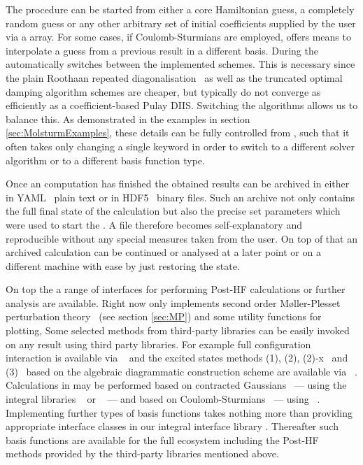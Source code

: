 The \SCF procedure can be started from either a core Hamiltonian guess,
a completely random guess or any other arbitrary set of initial
coefficients supplied by the user via a \numpy array.
For some cases, \eg if Coulomb-Sturmians are employed,
\molsturm offers means to interpolate a guess from a previous result
in a different basis.
During the \SCF \molsturm automatically switches between
the implemented \SCF schemes.
This is necessary since the plain Roothaan
repeated diagonalisation~\cite{Roothaan1951}
as well as the truncated optimal damping algorithm schemes
are cheaper, but typically do not converge as efficiently
as a coefficient-based Pulay DIIS.
Switching the algorithms allows us to balance this.
As demonstrated in the examples in section \ref{sec:MolsturmExamples},
these details can be fully controlled from \python,
such that it often takes only changing a single keyword
in order to switch to a different solver algorithm or to a different
basis function type.

Once an \SCF computation has finished the obtained results can be archived
in either in YAML~\cite{Ben-Kiki2009} plain text or in HDF5~\cite{HDF5Manual}
binary files.
Such an archive not only contains the full final state of the calculation
but also the precise set parameters which were used to start the \SCF.
A file therefore becomes self-explanatory and reproducible
without any special measures taken from the user.
On top of that an archived calculation can be continued
or analysed at a later point or on a different machine with ease
by just restoring the state.

On top the \SCF a range of interfaces for
performing Post-HF calculations or further analysis are available.
Right now \molsturm only implements second order Møller-Plesset perturbation theory%
~(see section \ref{sec:MP})
and some utility functions for plotting,
Some selected methods from third-party libraries can be easily
invoked on any \SCF result using third party libraries.
For example full configuration interaction is available via \pyscf~\cite{Sun2017}
and the excited states methods
\ADC(1), \ADC(2), \ADC(2)-x~\cite{Schirmer1982}
and \ADC(3)~\cite{Trofimov1999}
based on the algebraic diagrammatic construction scheme
are available via \adcman~\cite{Wormit2014}.
Calculations in \molsturm may be performed based on
contracted Gaussians~\cite{Hehre1969} --- using
the integral libraries \libint~\cite{Libint2_231,Libint2}
or \libcint~\cite{Sun2015} --- and based on
Coulomb-Sturmians~\cite{Shull1959,Avery2011} ---
using \sturmint~\cite{sturmintWeb}.
Implementing further types of basis functions
takes nothing more than providing appropriate interface classes in
our integral interface library \gint.
Thereafter such basis functions are available for the full \molsturm ecosystem
including the Post-HF methods
provided by the third-party libraries mentioned above.

